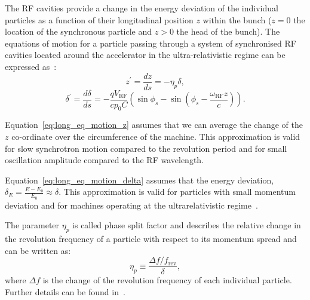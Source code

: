 
The RF cavities provide a change in the energy deviation of the individual particles as a function of their longitudinal position $z$ within the bunch ($z=0$ the location of the synchronous particle and $z>0$ the head of the bunch). The equations of motion for a particle passing through a system of synchronised RF cavities located around the accelerator in the ultra-relativistic regime can be expressed as~\cite{wolski2014}:
\begin{equation}\label{eq:long_eq_motion_z}
    z^\prime = \frac{dz}{ds} = - \eta_p \delta,
\end{equation}
\begin{equation}\label{eq:long_eq_motion_delta}
    \delta^\prime = \frac{d\delta}{ds} = - \frac{qV_\mathrm{RF}}{c p_0 C} \left ( \sin{\phi_s} - \sin{\left ( \phi_s - \frac{\omega_\mathrm{RF} z}{c} \right)} \right ).
\end{equation}

Equation~\eqref{eq:long_eq_motion_z} assumes that we can average the change of the $z$ co-ordinate over the circumference of the machine. This approximation is valid for slow synchrotron motion compared to the revolution period and for small oscillation amplitude compared to the RF wavelength\cite{wolski2014}. %

Equation~\eqref{eq:long_eq_motion_delta} assumes that the energy deviation, $\delta_E =\frac{E-E_0}{E_0} \approx \delta$. This approximation is valid for particles with small momentum deviation and for machines operating at the ultrarelativistic regime~\cite{wolski2014}. %

The parameter $\eta_p$ is called phase split factor and describes the relative change in the revolution frequency of a particle with respect to its momentum spread and can be written as:
\begin{equation}\label{eq:phase_slip_def}
    \eta_p \equiv \frac{\Delta f/f_\mathrm{rev}}{\delta},
\end{equation}
where $\Delta f$ is the change of the revolution frequency of each individual particle. Further details can be found in~\cite{wolski2014}.

